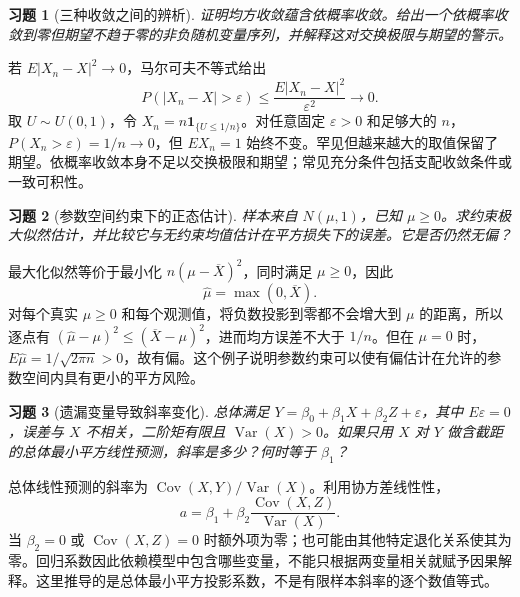 \documentclass[12pt,fontset=fandol]{ctexart}
\newtheorem{exercise}{习题}[section]
\begin{document}
\begin{exercise}[三种收敛之间的辨析]\label{q:B17.21}
证明均方收敛蕴含依概率收敛。给出一个依概率收敛到零但期望不趋于零的非负随机变量序列，并解释这对交换极限与期望的警示。\par{}
\end{exercise}

\begin{solve}\label{a:B17.21}若 $E|X_n-X|^2\to0$，马尔可夫不等式给出\[P(|X_n-X|>\varepsilon)\le\frac{E|X_n-X|^2}{\varepsilon^2}\to0.\]取 $U\sim U(0,1)$，令 $X_n=n\mathbf1_{\{U\le1/n\}}$。对任意固定 $\varepsilon>0$ 和足够大的 $n$，$P(X_n>\varepsilon)=1/n\to0$，但 $EX_n=1$ 始终不变。罕见但越来越大的取值保留了期望。依概率收敛本身不足以交换极限和期望；常见充分条件包括支配收敛条件或一致可积性。\end{solve}

\begin{exercise}[参数空间约束下的正态估计]\label{q:B17.22}
样本来自 $N(\mu,1)$，已知 $\mu\ge0$。求约束极大似然估计，并比较它与无约束均值估计在平方损失下的误差。它是否仍然无偏？\par{}
\end{exercise}

\begin{solve}\label{a:B17.22}最大化似然等价于最小化 $n(\mu-\overline X)^2$，同时满足 $\mu\ge0$，因此\[\widehat\mu=\max(0,\overline X).\]对每个真实 $\mu\ge0$ 和每个观测值，将负数投影到零都不会增大到 $\mu$ 的距离，所以逐点有 $(\widehat\mu-\mu)^2\le(\overline X-\mu)^2$，进而均方误差不大于 $1/n$。但在 $\mu=0$ 时，$E\widehat\mu=1/\sqrt{2\pi n}>0$，故有偏。这个例子说明参数约束可以使有偏估计在允许的参数空间内具有更小的平方风险。\end{solve}

\begin{exercise}[遗漏变量导致斜率变化]\label{q:B17.23}
总体满足 $Y=\beta_0+\beta_1X+\beta_2Z+\varepsilon$，其中 $E\varepsilon=0$，误差与 $X$ 不相关，二阶矩有限且 $\operatorname{Var}(X)>0$。如果只用 $X$ 对 $Y$ 做含截距的总体最小平方线性预测，斜率是多少？何时等于 $\beta_1$？\par{}
\end{exercise}

\begin{solve}\label{a:B17.23}总体线性预测的斜率为 $\operatorname{Cov}(X,Y)/\operatorname{Var}(X)$。利用协方差线性性，\[a=\beta_1+\beta_2\frac{\operatorname{Cov}(X,Z)}{\operatorname{Var}(X)}.\]当 $\beta_2=0$ 或 $\operatorname{Cov}(X,Z)=0$ 时额外项为零；也可能由其他特定退化关系使其为零。回归系数因此依赖模型中包含哪些变量，不能只根据两变量相关就赋予因果解释。这里推导的是总体最小平方投影系数，不是有限样本斜率的逐个数值等式。\end{solve}
\end{document}
